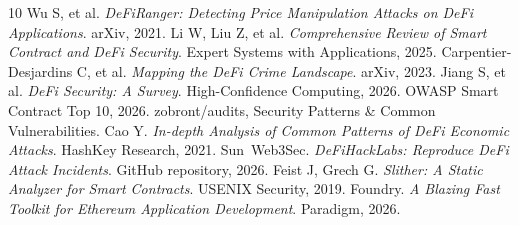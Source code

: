 \documentclass[10pt]{article}
\begin{document}
\begin{thebibliography}{10}
\setlength{\itemsep}{0pt}
 Wu S, et al. \textit{DeFiRanger: Detecting Price Manipulation Attacks on DeFi Applications}. arXiv, 2021.
 Li W, Liu Z, et al. \textit{Comprehensive Review of Smart Contract and DeFi Security}. Expert Systems with Applications, 2025.
 Carpentier-Desjardins C, et al. \textit{Mapping the DeFi Crime Landscape}. arXiv, 2023.
 Jiang S, et al. \textit{DeFi Security: A Survey}. High-Confidence Computing, 2026.
 OWASP Smart Contract Top 10, 2026.
 zobront/audits, Security Patterns \& Common Vulnerabilities.
 Cao Y. \textit{In-depth Analysis of Common Patterns of DeFi Economic Attacks}. HashKey Research, 2021.
 Sun~Web3Sec. \textit{DeFiHackLabs: Reproduce DeFi Attack Incidents}. GitHub repository, 2026.
 Feist J, Grech G. \textit{Slither: A Static Analyzer for Smart Contracts}. USENIX Security, 2019.
 Foundry. \textit{A Blazing Fast Toolkit for Ethereum Application Development}. Paradigm, 2026.
\end{thebibliography}
\end{document}
